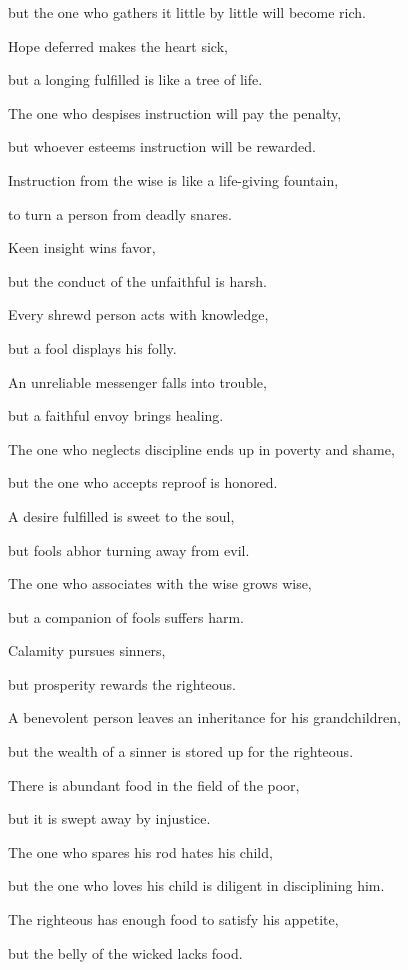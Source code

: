 {\par }{\Q but the one who gathers
it little by
little
will become rich.
\par }{\Q {}Hope
deferred
makes the heart
sick,
\par }{\Q but a longing
fulfilled
is like a tree
of life.
\par }{\Q {}The one who despises
instruction
will pay the penalty,
\par }{\Q but whoever esteems
instruction
will be rewarded.
\par }{\Q {}Instruction
from the wise
is like a life-giving
fountain,
\par }{\Q to turn
a person from deadly
snares.
\par }{\Q {}Keen
insight
wins
favor,
\par }{\Q but the conduct
of the unfaithful
is harsh.
\par }{\Q {}Every
shrewd
person acts
with knowledge,
\par }{\Q but a fool
displays
his folly.
\par }{\Q {}An unreliable
messenger
falls
into trouble,
\par }{\Q but a faithful
envoy
brings healing.
\par }{\Q {}The one who neglects
discipline
ends
up
in poverty
and shame,
\par }{\Q but the one who accepts
reproof
is honored.
\par }{\Q {}A desire
fulfilled is sweet
to the soul,
\par }{\Q but fools
abhor
turning away from
evil.
\par }{\Q {}The one who associates
with
the wise
grows wise,
\par }{\Q but a companion
of fools
suffers harm.
\par }{\Q {}Calamity
pursues
sinners,
\par }{\Q but prosperity
rewards
the righteous.
\par }{\Q {}A benevolent
person leaves an inheritance
for his grandchildren,
\par }{\Q but the wealth
of a sinner
is stored
up for the righteous.
\par }{\Q {}There
is abundant
food
in the field
of the poor,
\par }{\Q but it is
swept
away by injustice.
\par }{\Q {}The one who spares
his rod
hates
his child,
\par }{\Q but the one who loves
his child
is diligent
in disciplining him.
\par }{\Q {}The righteous
has enough food
to satisfy
his appetite,
\par }{\Q but the belly
of the wicked
lacks food.

}
